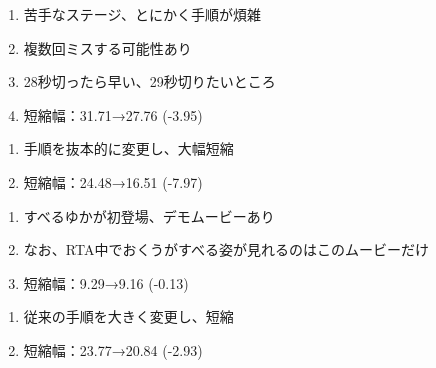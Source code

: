 \begin{enumerate}[label={\sarrow}]
\item 苦手なステージ、とにかく手順が煩雑
\item 複数回ミスする可能性あり
\item 28秒切ったら早い、29秒切りたいところ
\item 短縮幅：31.71→27.76 (-3.95)
\end{enumerate}



\begin{enumerate}[label={\sarrow}]
\item 手順を抜本的に変更し、大幅短縮
\item 短縮幅：24.48→16.51 (-7.97)
\end{enumerate}



\begin{enumerate}[label={\sarrow}]
\item すべるゆかが初登場、デモムービーあり
\item なお、RTA中でおくうがすべる姿が見れるのはこのムービーだけ
\item 短縮幅：9.29→9.16 (-0.13)
\end{enumerate}



\clearpage
\begin{enumerate}[label={\sarrow}]
\item 従来の手順を大きく変更し、短縮
\item 短縮幅：23.77→20.84 (-2.93)
\end{enumerate}



